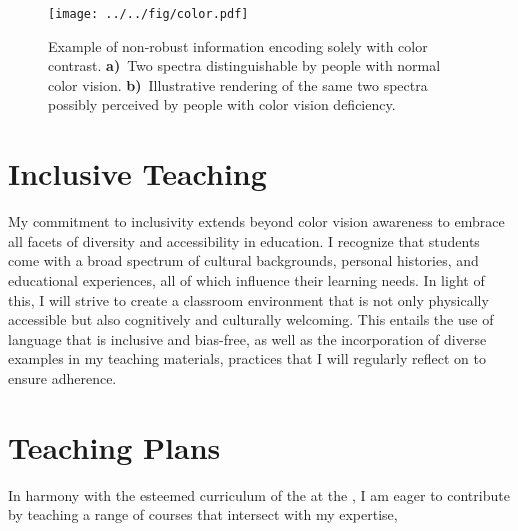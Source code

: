 \begin{figure}[!t]%
    \centering
    \texttt{[image: ../../fig/color.pdf]}
    \caption{Example of non-robust information encoding solely with color contrast. \textbf{a)}~Two spectra distinguishable by people with normal color vision. \textbf{b)}~Illustrative rendering of the same two spectra possibly perceived by people with color vision deficiency.}
    \label{fig:color}
\end{figure}

\section{Inclusive Teaching}
My commitment to inclusivity extends beyond color vision awareness to embrace all facets of diversity and accessibility in education. I recognize that students come with a broad spectrum of cultural backgrounds, personal histories, and educational experiences, all of which influence their learning needs. In light of this, I will strive to create a classroom environment that is not only physically accessible but also cognitively and culturally welcoming. This entails the use of language that is inclusive and bias-free, as well as the incorporation of diverse examples in my teaching materials, practices that I will regularly reflect on to ensure adherence.


\section{Teaching Plans}
In harmony with the esteemed curriculum of the \appDept{} at the \appSchool{}, I am eager to contribute by teaching a range of courses that intersect with my expertise,%